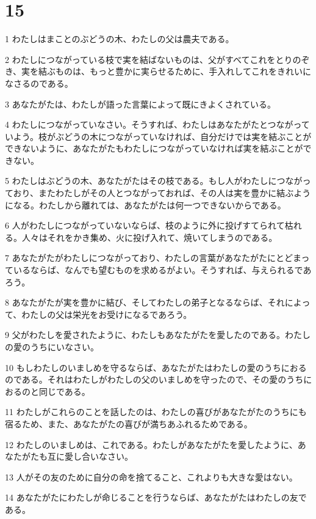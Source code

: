 \chapter{15}

\par 1 わたしはまことのぶどうの木、わたしの父は農夫である。
\par 2 わたしにつながっている枝で実を結ばないものは、父がすべてこれをとりのぞき、実を結ぶものは、もっと豊かに実らせるために、手入れしてこれをきれいになさるのである。
\par 3 あなたがたは、わたしが語った言葉によって既にきよくされている。
\par 4 わたしにつながっていなさい。そうすれば、わたしはあなたがたとつながっていよう。枝がぶどうの木につながっていなければ、自分だけでは実を結ぶことができないように、あなたがたもわたしにつながっていなければ実を結ぶことができない。
\par 5 わたしはぶどうの木、あなたがたはその枝である。もし人がわたしにつながっており、またわたしがその人とつながっておれば、その人は実を豊かに結ぶようになる。わたしから離れては、あなたがたは何一つできないからである。
\par 6 人がわたしにつながっていないならば、枝のように外に投げすてられて枯れる。人々はそれをかき集め、火に投げ入れて、焼いてしまうのである。
\par 7 あなたがたがわたしにつながっており、わたしの言葉があなたがたにとどまっているならば、なんでも望むものを求めるがよい。そうすれば、与えられるであろう。
\par 8 あなたがたが実を豊かに結び、そしてわたしの弟子となるならば、それによって、わたしの父は栄光をお受けになるであろう。
\par 9 父がわたしを愛されたように、わたしもあなたがたを愛したのである。わたしの愛のうちにいなさい。
\par 10 もしわたしのいましめを守るならば、あなたがたはわたしの愛のうちにおるのである。それはわたしがわたしの父のいましめを守ったので、その愛のうちにおるのと同じである。
\par 11 わたしがこれらのことを話したのは、わたしの喜びがあなたがたのうちにも宿るため、また、あなたがたの喜びが満ちあふれるためである。
\par 12 わたしのいましめは、これである。わたしがあなたがたを愛したように、あなたがたも互に愛し合いなさい。
\par 13 人がその友のために自分の命を捨てること、これよりも大きな愛はない。
\par 14 あなたがたにわたしが命じることを行うならば、あなたがたはわたしの友である。
